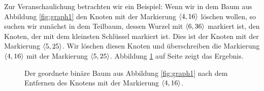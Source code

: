Zur Veranschaulichung betrachten wir ein Beispiel: Wenn wir in dem Baum aus Abbildung 
\ref{fig:graph1} den Knoten mit der Markierung $\pair(4,16)$ l\"oschen wollen,
so suchen wir zun\"achst in dem Teilbaum, dessen Wurzel mit $\pair(6,36)$ markiert ist, den
Knoten, der mit dem kleinsten Schl\"ussel markiert ist.  Dies ist der Knoten mit der
Markierung $\pair(5,25)$.  Wir l\"oschen diesen Knoten und \"uberschreiben die Markierung
$\pair(4,16)$ mit der Markierung $\pair(5,25)$.  Abbildung 
\ref{fig:graph2} auf Seite \pageref{fig:graph2} zeigt das Ergebnis.

\begin{figure}[!th]
  \centering
  \caption{Der geordnete bin\"are Baum aus Abbildung 
          \ref{fig:graph1} nach dem Entfernen des Knotens mit der Markierung $\pair(4,16)$.}
  \label{fig:graph2}
\end{figure}

